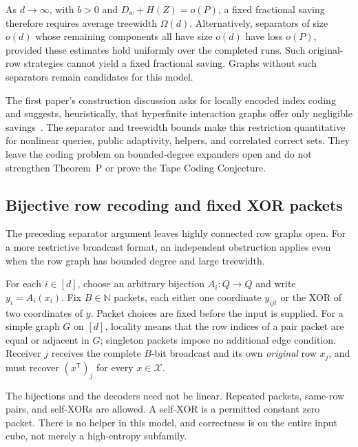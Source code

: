 As $d\to\infty$, with $b>0$ and $D_w+H(Z)=o(P)$, a fixed fractional saving
therefore requires average treewidth $\Omega(d)$.  Alternatively, separators
of size $o(d)$ whose remaining components all have size $o(d)$ have loss
$o(P)$, provided these estimates hold uniformly over the completed runs.
Such original-row strategies cannot yield a fixed fractional saving.
Graphs without such separators remain candidates for this model.

The first paper's construction discussion asks for locally encoded index
coding and suggests, heuristically, that hyperfinite interaction graphs offer
only negligible savings~\cite[section ``The construction side'']{FirstPaper2026}.
The separator and treewidth bounds make this restriction quantitative for
nonlinear queries, public adaptivity, helpers, and correlated correct sets.
They leave the coding problem on bounded-degree expanders open and do not
strengthen Theorem~P or prove the Tape Coding Conjecture.

\subsection{Bijective row recoding and fixed XOR packets}\label{subsec:local-xor}

The preceding separator argument leaves highly connected row graphs open.
For a more restrictive broadcast format, an independent obstruction applies
even when the row graph has bounded degree and large treewidth.

\begin{definition}\label{def:local-recoded-xor}
For each $i\in[d]$, choose an arbitrary bijection $A_i:Q\to Q$ and write
$y_i=A_i(x_i)$.  Fix $B\in\mathbb N$ packets, each either one coordinate
$y_{ijt}$ or the XOR of two coordinates of $y$.  Packet choices are fixed
before the input is supplied.  For a simple graph $G$ on $[d]$, locality means
that the row indices of a pair packet are equal or adjacent in $G$; singleton
packets impose no additional edge condition.  Receiver $j$ receives the
complete $B$-bit broadcast and its own \emph{original} row $x_j$, and must
recover $(x^{\mathsf T})_j$ for every $x\in\mathcal X$.
\end{definition}

The bijections and the decoders need not be linear.  Repeated packets,
same-row pairs, and self-XORs are allowed.  A self-XOR is a permitted constant
zero packet.  There is no helper in this model, and correctness is on the
entire input cube, not merely a high-entropy subfamily.

